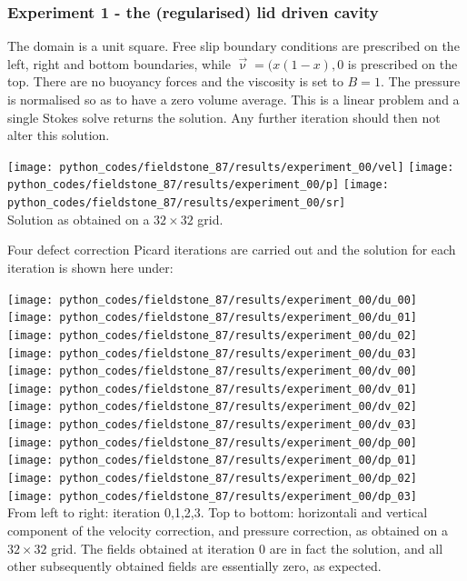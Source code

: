 \newpage
\subsubsection*{Experiment 1 - the (regularised) lid driven cavity}

The domain is a unit square. Free slip boundary conditions are prescribed on the 
left, right and bottom boundaries, while $\vec\upnu=(x(1-x),0$ is prescribed on the 
top. There are no buoyancy forces and the viscosity is set to $B=1$. 
The pressure is normalised so as to have a zero volume average. 
This is a linear problem and a single Stokes solve returns the solution. Any further 
iteration should then not alter this solution. 

\begin{center}
\texttt{[image: python\_codes/fieldstone\_87/results/experiment\_00/vel]}
\texttt{[image: python\_codes/fieldstone\_87/results/experiment\_00/p]}
\texttt{[image: python\_codes/fieldstone\_87/results/experiment\_00/sr]}\\
{\captionfont Solution as obtained on a $32\times 32$ grid.}
\end{center}

\noindent Four defect correction Picard iterations are carried out and the solution for 
each iteration is shown here under:  

\begin{center}
\texttt{[image: python\_codes/fieldstone\_87/results/experiment\_00/du\_00]}
\texttt{[image: python\_codes/fieldstone\_87/results/experiment\_00/du\_01]}
\texttt{[image: python\_codes/fieldstone\_87/results/experiment\_00/du\_02]}
\texttt{[image: python\_codes/fieldstone\_87/results/experiment\_00/du\_03]}\\
\texttt{[image: python\_codes/fieldstone\_87/results/experiment\_00/dv\_00]}
\texttt{[image: python\_codes/fieldstone\_87/results/experiment\_00/dv\_01]}
\texttt{[image: python\_codes/fieldstone\_87/results/experiment\_00/dv\_02]}
\texttt{[image: python\_codes/fieldstone\_87/results/experiment\_00/dv\_03]}\\
\texttt{[image: python\_codes/fieldstone\_87/results/experiment\_00/dp\_00]}
\texttt{[image: python\_codes/fieldstone\_87/results/experiment\_00/dp\_01]}
\texttt{[image: python\_codes/fieldstone\_87/results/experiment\_00/dp\_02]}
\texttt{[image: python\_codes/fieldstone\_87/results/experiment\_00/dp\_03]}\\
{\captionfont From left to right: iteration 0,1,2,3. 
Top to bottom: horizontali and vertical component of the velocity correction, 
and pressure correction, as obtained on a $32\times 32$ grid. The fields obtained at iteration 0 
are in fact the solution, and all other subsequently obtained fields 
are essentially zero, as expected.}
\end{center}


